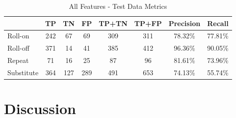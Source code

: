 \documentclass[letterpaper, 10 pt, conference]{ieeeconf}  %
\begin{document}
\begin{table}[h]
\begin{center}
\begin{tabular}{|l|c|c|c|c|c|c|c|} \hline
& TP & TN & FP & TP+TN & TP+FP & Precision & Recall \\ \hline
Roll-on & 242 & 67 & 69 & 309 & 311 & 78.32\% & 77.81\% \\ \hline
Roll-off & 371 & 14 & 41 & 385 & 412 & 96.36\% & 90.05\% \\ \hline
Repeat & 71 & 16 & 25 & 87 & 96 & 81.61\% & 73.96\% \\ \hline
Substitute & 364 & 127 & 289 & 491 & 653 & 74.13\% & 55.74\% \\ \hline
\end{tabular}
\caption{All Features - Test Data Metrics}
\label{table:alltdm}
\end{center}
\end{table}

\section{Discussion}



\end{document}
